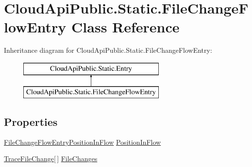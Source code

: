 \hypertarget{class_cloud_api_public_1_1_static_1_1_file_change_flow_entry}{\section{Cloud\-Api\-Public.\-Static.\-File\-Change\-Flow\-Entry Class Reference}
\label{class_cloud_api_public_1_1_static_1_1_file_change_flow_entry}
}


 


Inheritance diagram for Cloud\-Api\-Public.\-Static.\-File\-Change\-Flow\-Entry\-:\begin{figure}[H]
\begin{center}
\leavevmode
\includegraphics[height=2.000000cm]{class_cloud_api_public_1_1_static_1_1_file_change_flow_entry}
\end{center}
\end{figure}
\subsection*{Properties}
\begin{DoxyCompactItemize}
\item 
\hypertarget{class_cloud_api_public_1_1_static_1_1_file_change_flow_entry_a98b647c2389f8bda9c36991fe70ace16}{\hyperlink{namespace_cloud_api_public_1_1_static_a9082ca8fb56ff22723a53cd835e02451}{File\-Change\-Flow\-Entry\-Position\-In\-Flow} \hyperlink{class_cloud_api_public_1_1_static_1_1_file_change_flow_entry_a98b647c2389f8bda9c36991fe70ace16}{Position\-In\-Flow}}\label{class_cloud_api_public_1_1_static_1_1_file_change_flow_entry_a98b647c2389f8bda9c36991fe70ace16}

\begin{DoxyCompactList}\small\item\em \end{DoxyCompactList}\item 
\hypertarget{class_cloud_api_public_1_1_static_1_1_file_change_flow_entry_ae6a9b0f56f9949bbd3b0c648300a03ad}{\hyperlink{class_cloud_api_public_1_1_static_1_1_trace_file_change}{Trace\-File\-Change}\mbox{[}$\,$\mbox{]} \hyperlink{class_cloud_api_public_1_1_static_1_1_file_change_flow_entry_ae6a9b0f56f9949bbd3b0c648300a03ad}{File\-Changes}}\label{class_cloud_api_public_1_1_static_1_1_file_change_flow_entry_ae6a9b0f56f9949bbd3b0c648300a03ad}

\begin{DoxyCompactList}\small\item\em \end{DoxyCompactList}\end{DoxyCompactItemize}


